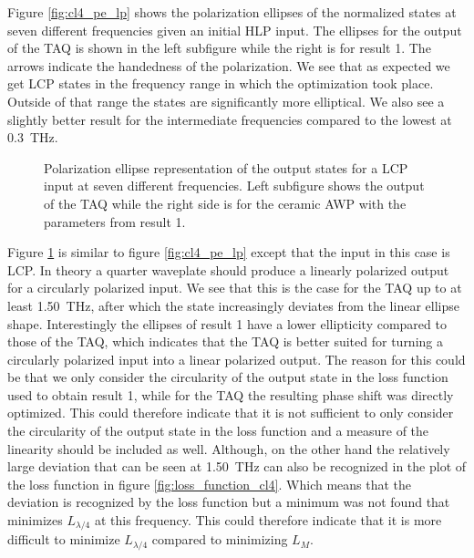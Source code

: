 Figure \ref{fig:cl4_pe_lp} shows the polarization ellipses of the normalized states at seven different frequencies given an initial HLP input. The ellipses for the output of the TAQ is shown in the left subfigure while the right is for result 1. The arrows indicate the handedness of the polarization. We see that as expected we get LCP states in the frequency range in which the optimization took place. Outside of that range the states are significantly more elliptical. We also see a slightly better result for the intermediate frequencies compared to the lowest at \SI{0.3}{\tera \hertz}. 


\begin{figure}[H]
    \centering
    
    \caption{Polarization ellipse representation of the output states for a LCP input at seven different frequencies. Left subfigure shows the output of the TAQ while the right side is for the ceramic AWP with the parameters from result 1.}
    \label{fig:cl4_pe_cp}
\end{figure}

Figure \ref{fig:cl4_pe_cp} is similar to figure \ref{fig:cl4_pe_lp} except that the input in this case is LCP. In theory a quarter waveplate should produce a linearly polarized output for a circularly polarized input. We see that this is the case for the TAQ up to at least \SI{1.50}{\tera \hertz}, after which the state increasingly deviates from the linear ellipse shape. Interestingly the ellipses of result 1 have a lower ellipticity compared to those of the TAQ, which indicates that the TAQ is better suited for turning a circularly polarized input into a linear polarized output. The reason for this could be that we only consider the circularity of the output state in the loss function used to obtain result 1, while for the TAQ the resulting phase shift was directly optimized. This could therefore indicate that it is not sufficient to only consider the circularity of the output state in the loss function and a measure of the linearity should be included as well. Although, on the other hand the relatively large deviation that can be seen at \SI{1.50}{\tera \hertz} can also be recognized in the plot of the loss function in figure \ref{fig:loss_function_cl4}. Which means that the deviation is recognized by the loss function but a minimum was not found that minimizes $L_{\lambda/4}$ at this frequency. This could therefore indicate that it is more difficult to minimize $L_{\lambda/4}$ compared to minimizing $L_M$.

